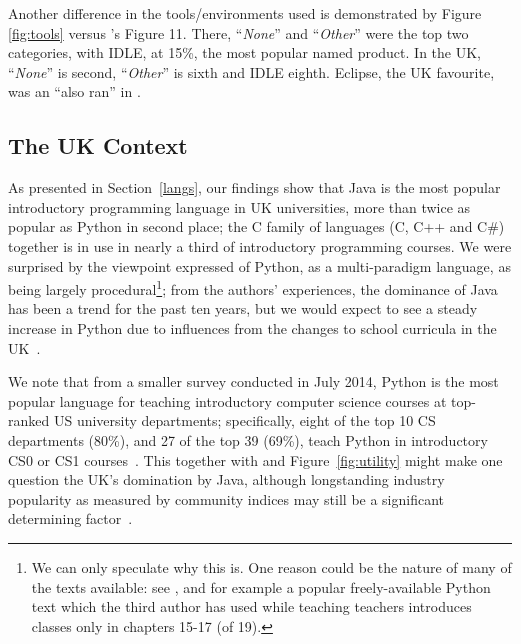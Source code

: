\documentclass[english,submission]{programming}
\begin{document}
Another difference in the tools/environments used is demonstrated by
Figure \ref{fig:tools} versus \cite{mason+cooper:2014}'s Figure
11. There, ``{\emph{None}}'' and ``{\emph{Other}}'' were the top two
categories, with IDLE, at 15\%, the most popular named product. In the
UK, ``{\emph{None}}'' is second, ``{\emph{Other}}'' is sixth and IDLE
eighth. Eclipse, the UK favourite, was an ``also ran'' in
\cite{mason+cooper:2014}.

\subsection{The UK Context}

As presented in Section~\ref{langs}, our findings show that Java is
the most popular introductory programming language in UK universities,
more than twice as popular as Python in second place; the C family of
languages (C, C++ and C\#) together is in use in nearly a third of
introductory programming courses. We were surprised by the viewpoint
expressed of Python, as a multi-paradigm language, as being largely
procedural\footnote{We can only speculate why this is. One reason could be the nature of many of the texts available: see \cite{McMaster2016java}, and for example a popular freely-available Python text \cite{Downey2012a} which the third author has used while teaching teachers introduces classes only in chapters 15-17 (of 19).}; from the authors' experiences, the dominance of Java has
been a trend for the past ten years, but we would expect to see a
steady increase in Python due to influences from the changes to school
curricula in the UK~\cite{brown-et-al-toce2014}.

We note that from a smaller survey conducted in July 2014, Python is
the most popular language for teaching introductory computer science
courses at top-ranked US university departments; specifically, eight
of the top 10 CS departments (80\%), and 27 of the top 39 (69\%),
teach Python in introductory CS0 or CS1 courses~\cite{guo:2014}.  This
together with \cite{mason+cooper:2014} and Figure~\ref{fig:utility}
might make one question the UK's domination by Java, although
longstanding industry popularity as measured by community indices may
still be a significant determining factor~\cite{tiobe:nov2016}.
\end{document}

